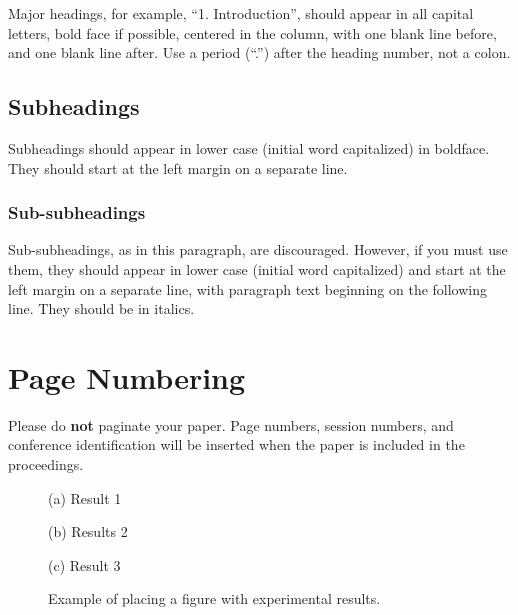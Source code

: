 \documentclass{article}
\begin{document}
Major headings, for example, ``1. Introduction'', should appear in all capital letters, bold face if possible, centered in the column, with one blank line before, and one blank line after. Use a period (``.'') after the heading number, not a colon.

\subsection{Subheadings}

Subheadings should appear in lower case (initial word capitalized) in boldface. They should start at the left margin on a separate line.

\subsubsection{Sub-subheadings}

Sub-subheadings, as in this paragraph, are discouraged. However, if you must use them, they should appear in lower case (initial word capitalized) and start at the left margin on a separate line, with paragraph text beginning on the following line.  They should be in italics.

\section{Page Numbering}

Please do {\bf not} paginate your paper. Page numbers, session numbers, and conference identification will be inserted when the paper is included in the proceedings.

%
\begin{figure}[t]
  \begin{minipage}[b]{1.0\linewidth}
    \centering
    \vspace{1.5cm}
    \centerline{(a) Result 1}\medskip
  \end{minipage}
  \begin{minipage}[b]{.48\linewidth}
    \centering
    \vspace{1.5cm}
    \centerline{(b) Results 2}\medskip
  \end{minipage}
  \hfill
  \begin{minipage}[b]{0.48\linewidth}
    \centering
    \vspace{1.5cm}
    \centerline{(c) Result 3}\medskip
  \end{minipage}
  \caption{Example of placing a figure with experimental results.}
  \label{fig:res}
\end{figure}
\end{document}
